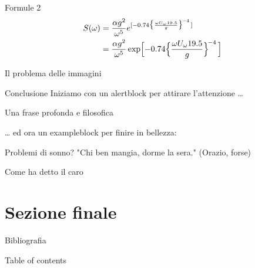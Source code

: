 \documentclass{beamer}
\begin{document}
\begin{frame}{Formule 2}
    \begin{align*}
        S(\omega) 
        &= \frac{\alpha g^2}{\omega^5} e^{[ -0.74\bigl\{\frac{\omega U_\omega         19.5}{g}\bigr\}^{\!-4}\,]} \\
        &= \frac{\alpha g^2}{\omega^5} \exp\Bigl[ -0.74\Bigl\{\frac{\omega       U_\omega 19.5}{g}\Bigr\}^{\!-4}\,\Bigr] 
    \end{align*}
\end{frame}


\begin{frame}{Il problema delle immagini}
\end{frame}

\begin{frame}{Conclusione}
    Iniziamo con un \alert{alertblock} per attirare l'attenzione \dots
    \begin{alertblock}{Una frase profonda e filosofica}
        \lipsum[66]
    \end{alertblock}
\end{frame}
\begin{frame}{}
    \dots
    ed ora un exampleblock per finire in bellezza:
    \begin{exampleblock}{Problemi di sonno?}
        "Chi ben mangia, dorme la sera." 
        \flushright
        (Orazio, forse)
    \end{exampleblock}
\end{frame}

\begin{frame}
	\nocite{CF} Come ha detto il caro \cite{RAM} \newline
	\pause
\end{frame}

\section{Sezione finale}

\begin{frame}{Bibliografia}
	\printbibliography[heading=none]
\end{frame}

\begin{frame}{Table of contents}
	\tableofcontents
\end{frame}
\end{document}
